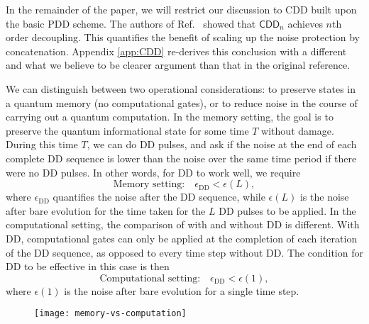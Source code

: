 \documentclass[pra,reprint,superscriptaddress]{revtex4-2}
\newcommand{\CDDn}{\mathsf{CDD}_n}
\begin{document}
In the remainder of the paper, we will restrict our discussion to CDD built upon the basic PDD scheme. The authors of Ref.~\cite{khodjasteh2005fault} showed that $\CDDn$ achieves $n$th order decoupling. This quantifies the benefit of scaling up the noise protection by concatenation. Appendix \ref{app:CDD} re-derives this conclusion with a different and what we believe to be clearer argument than that in the original reference. 

We can distinguish between two operational considerations: to preserve states in a quantum memory (no computational gates), or to reduce noise in the course of carrying out a quantum computation. In the memory setting, the goal is to preserve the quantum informational state for some time $T$ without damage. During this time $T$, we can do DD pulses, and ask if the noise at the end of each complete DD sequence is lower than the noise over the same time period if there were no DD pulses. In other words, for DD to work well, we require
\begin{equation}
\textrm{Memory setting:}\quad \epsilon_\mathrm{DD}<\epsilon(L),
\end{equation}
where $\epsilon_\mathrm{DD}$ quantifies the noise after the DD sequence, while $\epsilon(L)$ is the noise after bare evolution for the time taken for the $L$ DD pulses to be applied.
In the computational setting, the comparison of with and without DD is different. With DD, computational gates can only be applied at the completion of each iteration of the DD sequence, as opposed to every time step without DD. The condition for DD to be effective in this case is then
\begin{equation}\label{eq:cond}
\textrm{Computational setting:}\quad\epsilon_\mathrm{DD}<\epsilon(1),
\end{equation}
where $\epsilon(1)$ is the noise after bare evolution for a single time step. 

\begin{figure}[htbp]
 \centering
 \texttt{[image: memory-vs-computation]}
 \caption{}
 \label{fig:memvscom}
\end{figure}
\end{document}
